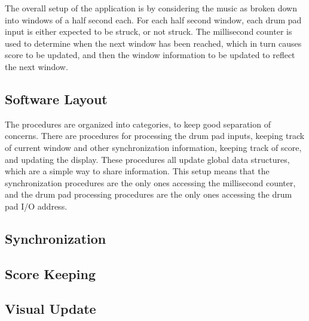 \documentclass{subfile}
\begin{document}
  The overall setup of the application is by considering the music as broken down into 
  windows of a half second each. 
  For each half second window, each drum pad input is either expected to be struck, or not 
  struck.
  The millisecond counter is used to determine when the next window has been reached, which 
  in turn causes score to be updated, and then the window information to be updated to reflect 
  the next window.

  \subsection{Software Layout} 
  The procedures are organized into categories, to keep good separation of concerns. 
  There are procedures for processing the drum pad inputs, keeping track of current window and 
  other synchronization information, keeping track of score, and updating the display. 
  These procedures all update global data structures, which are a simple way to share information. 
  This setup means that the synchronization procedures are the only ones accessing the millisecond 
  counter, and the drum pad processing procedures are the only ones accessing the drum pad I/O address.

  \subsection{Synchronization} 

  \subsection{Score Keeping}

  \subsection{Visual Update}
\end{document}
